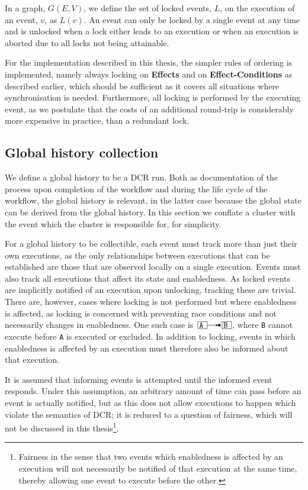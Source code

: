 \documentclass{article}
\begin{document}
	In a graph, $G(E,V)$, we define the set of locked events, $L$, on the execution of an event, $v$, as $L(v)$.
	An event can only be locked by a single event at any time and is unlocked when a lock either leads to an execution or when an execution is aborted due to all locks not being attainable.

	For the implementation described in this thesis, the simpler rules of ordering is implemented, namely always locking on \textbf{Effects} and on \textbf{Effect-Conditions} as described earlier, which should be sufficient as it covers all situations where synchronisation is needed.
	Furthermore, all locking is performed by the executing event, as we postulate that the costs of an additional round-trip is considerably more expensive in practice, than a redundant lock.

	\subsection{Global history collection}
	\label{subsec:global-history-collection}

	We define a global history to be a DCR run.
	Both as documentation of the process upon completion of the workflow and during the life cycle of the workflow, the global history is relevant, in the latter case because the global state can be derived from the global history.
	In this section we conflate a cluster with the event which the cluster is responsible for, for simplicity.

	For a global history to be collectible, each event must track more than just their own executions, as the only relationships between executions that can be established are those that are observed locally on a single execution.
	Events must also track all executions that affect its state and enabledness.
	As locked events are implicitly notified of an execution upon unlocking, tracking these are trivial.
	There are, however, cases where locking is not performed but where enabledness is affected, as locking is concerned with preventing race conditions and not necessarily changes in enabledness.
	One such case is $\ev{A} \crel \ev{B}$, where \texttt{B} cannot execute before \texttt{A} is executed or excluded.
	In addition to locking, events in which enabledness is affected by an execution must therefore also be informed about that execution.

	It is assumed that informing events is attempted until the informed event responds.
	Under this assumption, an arbitrary amount of time can pass before an event is actually notified, but as this does not allow executions to happen which violate the semantics of DCR; it is reduced to a question of fairness, which will not be discussed in this thesis\footnote{Fairness in the sense that two events which enabledness is affected by an execution will not necessarily be notified of that execution at the same time, thereby allowing one event to execute before the other.}.
\end{document}
